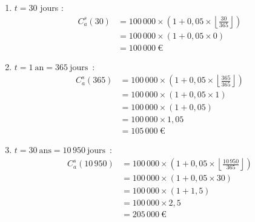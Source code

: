 \documentclass{article}
\begin{document}
\begin{enumerate}[label=\textbf{R1.\arabic*}]
\begin{enumerate}[label=(\alph*)]
              \item \( t = 30 \) jours : 
                    \begin{align*}
                        C_a^s(30) & = 100\,000 \times \left(1 + 0,05 \times \left\lfloor \frac{30}{365} \right\rfloor \right) \\
                                  & = 100\,000 \times \left(1 + 0,05 \times 0 \right)                                         \\
                                  & = \boxed{100\,000\ \text{€}}                                                            
                    \end{align*}
                            
              \item $t = 1\ \text{an} = 365\ \text{jours}$~: 
                    \begin{align*}
                        C_a^s(365) & = 100\,000 \times \left(1 + 0,05 \times \left\lfloor \frac{365}{365} \right\rfloor \right) \\
                                   & = 100\,000 \times \left(1 + 0,05 \times 1 \right)                                          \\
                                   & = 100\,000 \times \left(1 + 0,05 \right)                                                   \\
                                   & = 100\,000 \times 1,05                                                                     \\
                                   & = \boxed{105\,000\ \text{€}}                                                             
                    \end{align*}
                            
              \item $t = 30\ \text{ans} = 10\,950\ \text{jours}$~: 
                    \begin{align*}
                        C_a^s(10\,950) & = 100\,000 \times \left(1 + 0,05 \times \left\lfloor \frac{10\,950}{365} \right\rfloor \right) \\
                                       & = 100\,000 \times \left(1 + 0,05 \times 30 \right)                                             \\
                                       & = 100\,000 \times \left(1 + 1,5 \right)                                                        \\
                                       & = 100\,000 \times 2,5                                                                          \\
                                       & = \boxed{205\,000\ \text{€}}                                                                 
                    \end{align*}
          \end{enumerate}
          

\end{enumerate}
\end{document}
